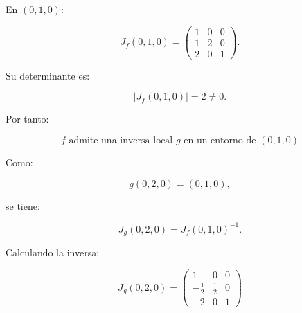 \documentclass[11pt,a4paper]{article}
\begin{document}
En \((0,1,0)\):

\[
J_f(0,1,0)
=
\begin{pmatrix}
1&0&0\\
1&2&0\\
2&0&1
\end{pmatrix}.
\]

Su determinante es:

\[
|J_f(0,1,0)|=2\neq0.
\]

Por tanto:

\[
\boxed{
f\text{ admite una inversa local }g
\text{ en un entorno de }(0,1,0)
}
\]

Como:

\[
g(0,2,0)=(0,1,0),
\]

se tiene:

\[
J_g(0,2,0)
=
J_f(0,1,0)^{-1}.
\]

Calculando la inversa:

\[
\boxed{
J_g(0,2,0)
=
\begin{pmatrix}
1&0&0\\[1mm]
-\frac12&\frac12&0\\[1mm]
-2&0&1
\end{pmatrix}
}
\]
\end{document}
